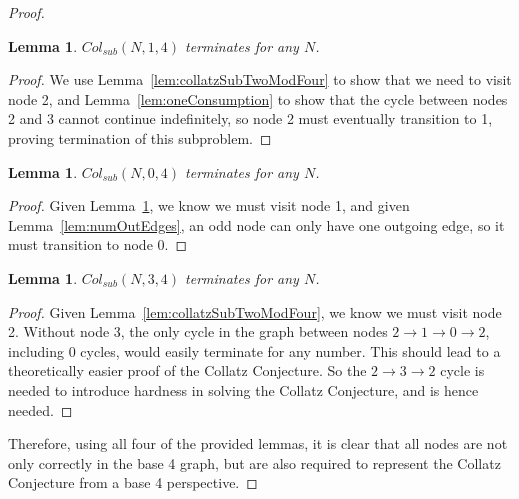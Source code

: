 \documentclass[12pt]{article}
\newtheorem{lemma}[theorem]{Lemma}
\theoremstyle{definition}
\begin{document}
\begin{proof}
\begin{lemma}
\label{lem:collatzSubOneModFour}
$Col_{sub}(N,1,4)$ terminates for any $N$.
\end{lemma}
\begin{proof}
We use Lemma~\ref{lem:collatzSubTwoModFour} to show that we need to visit node 2, and Lemma~\ref{lem:oneConsumption} to show that the cycle between nodes 2 and 3 cannot continue indefinitely, so node 2 must eventually transition to 1, proving termination of this subproblem.
\end{proof}
\begin{lemma}
\label{lem:collatzSubZeroModFour}
$Col_{sub}(N,0,4)$ terminates for any $N$.
\end{lemma}
\begin{proof}
Given Lemma~\ref{lem:collatzSubOneModFour}, we know we must visit node 1, and given Lemma~\ref{lem:numOutEdges}, an odd node can only have one outgoing edge, so it must transition to node 0.
\end{proof}
\begin{lemma}
\label{lem:collatzSubThreeModFour}
$Col_{sub}(N,3,4)$ terminates for any $N$.
\end{lemma}
\begin{proof}
Given Lemma~\ref{lem:collatzSubTwoModFour}, we know we must visit node 2. Without node 3, the only cycle in the graph between nodes $2 \rightarrow 1 \rightarrow 0 \rightarrow 2$, including 0 cycles, would easily terminate for any number. This should lead to a theoretically easier proof of the Collatz Conjecture. So the $2 \rightarrow 3 \rightarrow 2$ cycle is needed to introduce hardness in solving the Collatz Conjecture, and is hence needed.
\end{proof}
Therefore, using all four of the provided lemmas, it is clear that all nodes are not only correctly in the base 4 graph, but are also required to represent the Collatz Conjecture from a base 4 perspective.
\end{proof}
\end{document}
